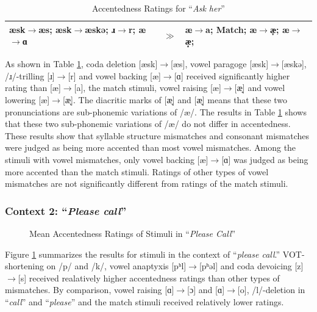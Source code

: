 \begin{table}[!h]
  \figSpace
  \centering
  \caption{Accentedness Ratings for “\textit{Ask her}” }
  \label{table:ah1}%
    \begin{tabular}{lcl}
    \toprule
 	æsk$\rightarrow$æs; æsk$\rightarrow$æskə; ɹ$\rightarrow$r; æ$\rightarrow$ɑ &$\gg$ & æ$\rightarrow$a; Match; æ$\rightarrow$æ̞; æ$\rightarrow$ æ̝;\\
    \bottomrule
    \end{tabular}%
    \figSpace
\end{table}%

As shown in Table \ref{table:ah1}, coda deletion [æsk]$\rightarrow$[æs], vowel paragoge [æsk]$\rightarrow$[æskə], /ɹ/-trilling [ɹ]$\rightarrow$[r] and vowel backing [æ]$\rightarrow$[ɑ] received significantly higher rating than [æ]$\rightarrow$[a], the match stimuli, vowel raising [æ]$\rightarrow$[æ̝] and vowel lowering [æ]$\rightarrow$[æ̞]. The diacritic marks of [æ̞] and [æ̝] means that these two pronunciations are sub-phonemic variations of /æ/. The results in Table \ref{table:ah1} shows that these two sub-phonemic variations of /æ/ do not differ in accentedness.  These results show that syllable structure mismatches and consonant mismatches were judged as being more accented than most vowel mismatches. Among the stimuli with vowel mismatches, only vowel backing [æ]$\rightarrow$[ɑ] was judged as being more accented than the match stimuli. Ratings of other types of vowel mismatches are not significantly different from ratings of the match stimuli. 

\subsubsection{Context 2: “\textit{Please call}”}

\begin{figure}[!h]
  \figSpace
\centering

\caption{Mean Accentedness Ratings of Stimuli in “\textit{Please Call}”}
\label{fig:pc1}
\figSpace
\end{figure}

Figure \ref{fig:pc1} summarizes the results for stimuli in the context of “\textit{please call}.” VOT-shortening on /p/ and /k/, vowel anaptyxis [pʰl]$\rightarrow$[pʰəl] and coda devoicing [z]$\rightarrow$[s] received realatively higher accentedness ratings than other types of mismatches. By comparison, vowel raising [ɑ]$\rightarrow$[ɔ] and [ɑ]$\rightarrow$[o], /l/-deletion in “\textit{call}” and “\textit{please}” and the match stimuli received relatively lower ratings. 


